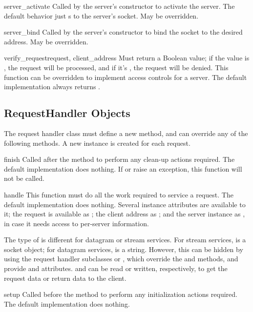 
\begin{funcdesc}{server_activate}{}
Called by the server's constructor to activate the server.  The default
behavior just s to the server's socket.
May be overridden.
\end{funcdesc}

\begin{funcdesc}{server_bind}{}
Called by the server's constructor to bind the socket to the desired
address.  May be overridden.
\end{funcdesc}

\begin{funcdesc}{verify_request}{request, client_address}
Must return a Boolean value; if the value is , the request will be
processed, and if it's , the request will be denied.
This function can be overridden to implement access controls for a server.
The default implementation always returns .
\end{funcdesc}

\subsection{RequestHandler Objects}

The request handler class must define a new  method,
and can override any of the following methods.  A new instance is
created for each request.

\begin{funcdesc}{finish}{}
Called after the  method to perform any clean-up
actions required.  The default implementation does nothing.  If
 or  raise an exception, this
function will not be called.
\end{funcdesc}

\begin{funcdesc}{handle}{}
This function must do all the work required to service a request.
The default implementation does nothing.
Several instance attributes are available to it; the request is
available as ; the client address as
; and the server instance as
, in case it needs access to per-server
information.

The type of  is different for datagram or stream
services.  For stream services,  is a socket
object; for datagram services,  is a string.
However, this can be hidden by using the  request handler subclasses
 or , which
override the  and  methods, and
provide  and  attributes.
 and  can be read or written,
respectively, to get the request data or return data to the client.
\end{funcdesc}

\begin{funcdesc}{setup}{}
Called before the  method to perform any
initialization actions required.  The default implementation does
nothing.
\end{funcdesc}
